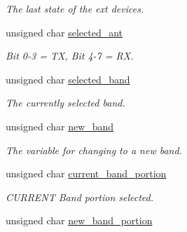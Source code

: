 \begin{CompactItemize}
\begin{CompactList}\small\item\em The last state of the ext devices. \item\end{CompactList}\item 
\hypertarget{structstruct__status_5ec7f0e741f49b1fff61e211ccab4a4d}{
unsigned char \hyperlink{structstruct__status_5ec7f0e741f49b1fff61e211ccab4a4d}{selected\_\-ant}}
\label{structstruct__status_5ec7f0e741f49b1fff61e211ccab4a4d}

\begin{CompactList}\small\item\em Bit 0-3 = TX, Bit 4-7 = RX. \item\end{CompactList}\item 
\hypertarget{structstruct__status_96014d1883e414c343243dc470986d1c}{
unsigned char \hyperlink{structstruct__status_96014d1883e414c343243dc470986d1c}{selected\_\-band}}
\label{structstruct__status_96014d1883e414c343243dc470986d1c}

\begin{CompactList}\small\item\em The currently selected band. \item\end{CompactList}\item 
\hypertarget{structstruct__status_8dbaf3fc52937e28c6b3f73869a22b3a}{
unsigned char \hyperlink{structstruct__status_8dbaf3fc52937e28c6b3f73869a22b3a}{new\_\-band}}
\label{structstruct__status_8dbaf3fc52937e28c6b3f73869a22b3a}

\begin{CompactList}\small\item\em The variable for changing to a new band. \item\end{CompactList}\item 
\hypertarget{structstruct__status_35243e81f3d444bee3f5104f323a8e35}{
unsigned char \hyperlink{structstruct__status_35243e81f3d444bee3f5104f323a8e35}{current\_\-band\_\-portion}}
\label{structstruct__status_35243e81f3d444bee3f5104f323a8e35}

\begin{CompactList}\small\item\em CURRENT Band portion selected. \item\end{CompactList}\item 
\hypertarget{structstruct__status_2833d022b5aee6fd2207fc12e1af67f7}{
unsigned char \hyperlink{structstruct__status_2833d022b5aee6fd2207fc12e1af67f7}{new\_\-band\_\-portion}}
\label{structstruct__status_2833d022b5aee6fd2207fc12e1af67f7}


\end{CompactItemize}
